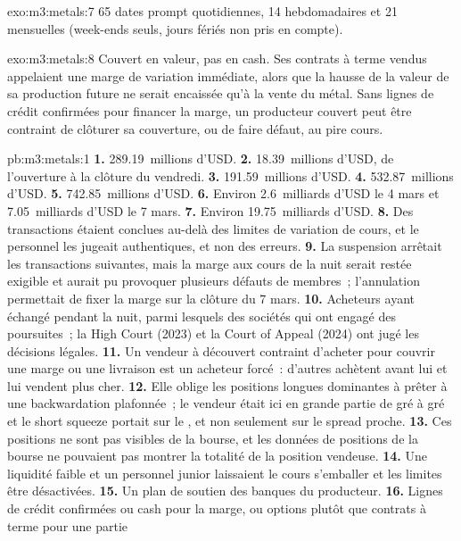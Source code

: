 \begin{solution}{exo:m3:metals:7}
65 dates prompt quotidiennes, 14 hebdomadaires et 21 mensuelles (week-ends seuls, jours fériés non pris en compte).
\end{solution}

\begin{solution}{exo:m3:metals:8}
Couvert en valeur, pas en cash. Ses contrats à terme vendus appelaient une marge de variation immédiate, alors que la hausse de la
valeur de sa production future ne serait encaissée qu'à la vente du métal. Sans
lignes de crédit confirmées pour financer la marge, un producteur couvert peut être contraint de clôturer sa couverture, ou de faire défaut, au
pire cours.
\end{solution}

\begin{solution}{pb:m3:metals:1}
\textbf{1.} 289.19~millions d'USD. \textbf{2.} 18.39~millions d'USD, de l'ouverture à la clôture du vendredi.
\textbf{3.} 191.59~millions d'USD. \textbf{4.} 532.87~millions d'USD. \textbf{5.} 742.85~millions d'USD.
\textbf{6.} Environ 2.6~milliards d'USD le 4 mars et 7.05~milliards d'USD le 7 mars. \textbf{7.} Environ
19.75~milliards d'USD. \textbf{8.} Des transactions étaient conclues au-delà des limites de variation de cours, et le personnel les jugeait
authentiques, et non des erreurs. \textbf{9.} La suspension arrêtait les transactions suivantes, mais la marge aux cours de la nuit
serait restée exigible et aurait pu provoquer plusieurs défauts de membres~; l'annulation permettait de fixer
la marge sur la clôture du 7 mars. \textbf{10.} Acheteurs ayant échangé pendant la nuit, parmi lesquels des sociétés qui
ont engagé des poursuites~; la High Court (2023) et la Court of Appeal (2024) ont jugé les décisions légales.
\textbf{11.} Un vendeur à découvert contraint d'acheter pour couvrir une marge ou une livraison est un acheteur forcé~: d'autres achètent avant lui
et lui vendent plus cher. \textbf{12.} Elle oblige les positions longues dominantes à prêter à une
backwardation plafonnée~; le vendeur était ici en grande partie de gré à gré et le short squeeze portait sur le
, et non seulement sur le spread proche. \textbf{13.} Ces positions ne sont pas visibles de la bourse, et
les données de positions de la bourse ne pouvaient pas montrer la totalité de la position vendeuse. \textbf{14.} Une liquidité faible et un personnel junior
laissaient le cours s'emballer et les limites être désactivées. \textbf{15.} Un plan de soutien des
banques du producteur. \textbf{16.} Lignes de crédit confirmées ou cash pour la marge, ou options plutôt que contrats à terme pour une partie

\end{solution}
